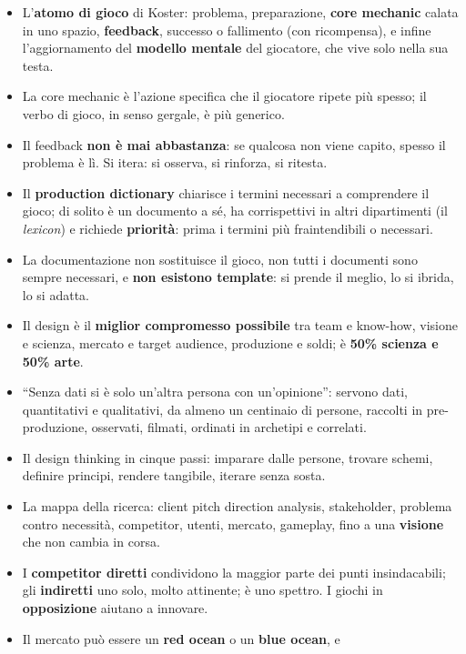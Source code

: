 \begin{itemize}
  \item L'\textbf{atomo di gioco} di Koster: problema, preparazione,
        \textbf{core mechanic} calata in uno spazio, \textbf{feedback},
        successo o fallimento (con ricompensa), e infine l'aggiornamento del
        \textbf{modello mentale} del giocatore, che vive solo nella sua testa.
  \item La core mechanic è l'azione specifica che il giocatore ripete più
        spesso; il verbo di gioco, in senso gergale, è più generico.
  \item Il feedback \textbf{non è mai abbastanza}: se qualcosa non viene
        capito, spesso il problema è lì. Si itera: si osserva, si rinforza, si
        ritesta.
  \item Il \textbf{production dictionary} chiarisce i termini necessari a
        comprendere il gioco; di solito è un documento a sé, ha corrispettivi
        in altri dipartimenti (il \emph{lexicon}) e richiede
        \textbf{priorità}: prima i termini più fraintendibili o necessari.
  \item La documentazione non sostituisce il gioco, non tutti i documenti sono
        sempre necessari, e \textbf{non esistono template}: si prende il
        meglio, lo si ibrida, lo si adatta.
  \item Il design è il \textbf{miglior compromesso possibile} tra team e
        know-how, visione e scienza, mercato e target audience, produzione e
        soldi; è \textbf{50\% scienza e 50\% arte}.
  \item ``Senza dati si è solo un'altra persona con un'opinione'': servono
        dati, quantitativi e qualitativi, da almeno un centinaio di persone,
        raccolti in pre-produzione, osservati, filmati, ordinati in archetipi e
        correlati.
  \item Il design thinking in cinque passi: imparare dalle persone, trovare
        schemi, definire principi, rendere tangibile, iterare senza sosta.
  \item La mappa della ricerca: client pitch direction analysis,
        stakeholder, problema contro necessità, competitor, utenti, mercato,
        gameplay, fino a una \textbf{visione} che non cambia in corsa.
  \item I \textbf{competitor diretti} condividono la maggior parte dei punti
        insindacabili; gli \textbf{indiretti} uno solo, molto attinente; è uno
        spettro. I giochi in \textbf{opposizione} aiutano a innovare.
  \item Il mercato può essere un \textbf{red ocean} o un \textbf{blue ocean}, e

\end{itemize}
